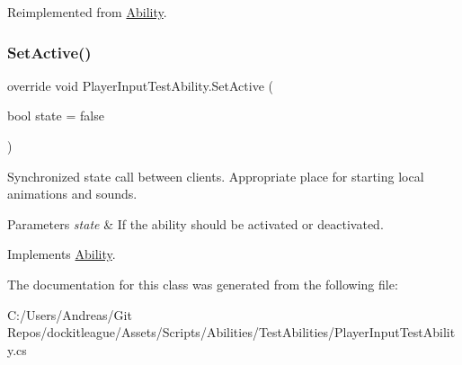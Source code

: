 Reimplemented from \hyperlink{class_ability_ae8217a23a940c9ce450e827856d7020b}{Ability}.

\hypertarget{class_player_input_test_ability_a41b2128e36247c96b00df0c1052873f3}{}\label{class_player_input_test_ability_a41b2128e36247c96b00df0c1052873f3} 
\subsubsection{\texorpdfstring{Set\+Active()}{SetActive()}}
{\footnotesize\ttfamily override void Player\+Input\+Test\+Ability.\+Set\+Active (\begin{DoxyParamCaption}\item[{bool}]{state = {\ttfamily false} }\end{DoxyParamCaption})\hspace{0.3cm}{\ttfamily [virtual]}}



Synchronized state call between clients. Appropriate place for starting local animations and sounds. 


\begin{DoxyParams}{Parameters}
{\em state} & If the ability should be activated or deactivated.\\
\hline
\end{DoxyParams}


Implements \hyperlink{class_ability_a10f7f3c2b63eeef6e352aee48d246384}{Ability}.



The documentation for this class was generated from the following file\+:\begin{DoxyCompactItemize}
\item 
C\+:/\+Users/\+Andreas/\+Git Repos/dockitleague/\+Assets/\+Scripts/\+Abilities/\+Test\+Abilities/Player\+Input\+Test\+Ability.\+cs\end{DoxyCompactItemize}
